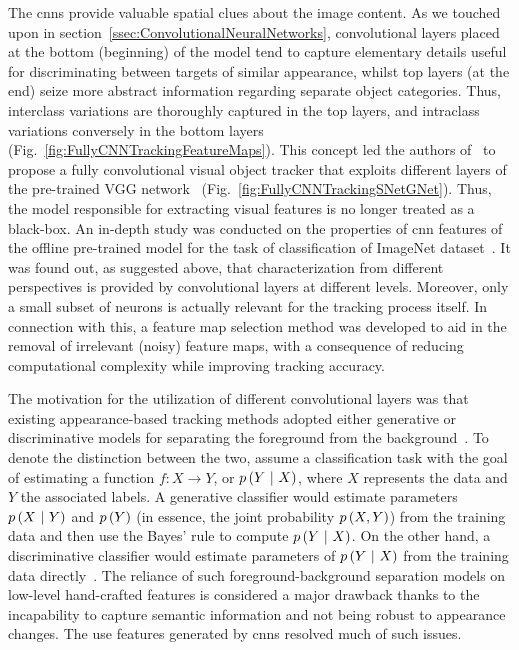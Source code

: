 The \glspl{cnn} provide valuable spatial clues about the image content. As we touched upon in section~\ref{ssec:ConvolutionalNeuralNetworks}, convolutional layers placed at the bottom (beginning) of the model tend to capture elementary details useful for discriminating between targets of similar appearance, whilst top layers (at the end) seize more abstract information regarding separate object categories. Thus, interclass variations are thoroughly captured in the top layers, and intraclass variations conversely in the bottom layers (Fig.~\ref{fig:FullyCNNTrackingFeatureMaps}). This concept led the authors of~\cite{wang2015votcnn} to propose a fully convolutional visual object tracker that exploits different layers of the pre-trained VGG network~\cite{simonyan2015verydeepcnn} (Fig.~\ref{fig:FullyCNNTrackingSNetGNet}). Thus, the model responsible for extracting visual features is no longer treated as a black-box. An in-depth study was conducted on the properties of \gls{cnn} features of the offline pre-trained model for the task of classification of ImageNet dataset~\cite{deng2009imagenet}. It was found out, as suggested above, that characterization from different perspectives is provided by convolutional layers at different levels. Moreover, only a small subset of neurons is actually relevant for the tracking process itself. In connection with this, a feature map selection method was developed to aid in the removal of irrelevant (noisy) feature maps, with a consequence of reducing computational complexity while improving tracking accuracy.

The motivation for the utilization of different convolutional layers was that existing appearance-based tracking methods adopted either generative or discriminative models for separating the foreground from the background~\cite{wang2015votcnn}. To denote the distinction between the two, assume a classification task with the goal of estimating a function $f: X \to Y$, or $p \left( Y \ | \ X \right)$, where $X$ represents the data and $Y$ the associated labels. A generative classifier would estimate parameters $p \left( X \ | \ Y \right)$ and $p \left( Y \right)$ (in essence, the joint probability $p \left( X, Y \right)$) from the training data and then use the Bayes' rule to compute $p \left( Y \ | \ X \right)$. On the other hand, a discriminative classifier would estimate parameters of $p \left( Y \ | \ X \right)$ from the training data directly~\cite{ng2002discriminative}. The reliance of such foreground-background separation models on low-level hand-crafted features is considered a major drawback thanks to the incapability to capture semantic information and not being robust to appearance changes. The use features generated by \glspl{cnn} resolved much of such issues.


